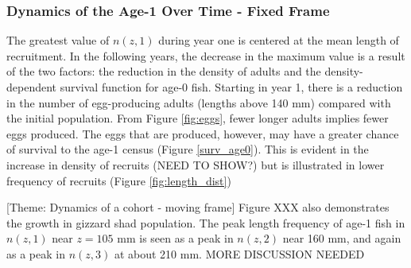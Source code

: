 \documentclass[preprint,review,12pt,authoryear]{elsarticle}
\begin{document}
\subsubsection{Dynamics of the Age-1 Over Time - Fixed Frame}
 The greatest value of $n(z,1)$ during year one is centered at the mean length of recruitment. 
 In the following years, the decrease in the maximum value is a result of the two factors:  the reduction in the density of adults and the density-dependent survival function for age-0 fish. 
 Starting in year 1, there is a reduction in the number of egg-producing adults (lengths above 140 mm) compared with the initial population.  
 From Figure \ref{fig:eggs}, fewer longer adults implies fewer eggs produced.  
 The eggs that are produced, however, may have a greater chance of survival to the age-1 census (Figure \ref{surv_age0}).  
 This is evident in the increase in density of recruits (NEED TO SHOW?) but is illustrated in lower frequency of recruits (Figure \ref{fig:length_dist}) 




[Theme: Dynamics of a cohort - moving frame]
Figure XXX also demonstrates the growth in gizzard shad population.  
The peak length frequency of age-1 fish in $n(z,1)$ near $z = 105$ mm is seen as a peak in $n(z,2)$ near 160 mm, and again as a peak in $n(z,3)$ at about 210 mm. 
 MORE DISCUSSION NEEDED


%
%
\end{document}
